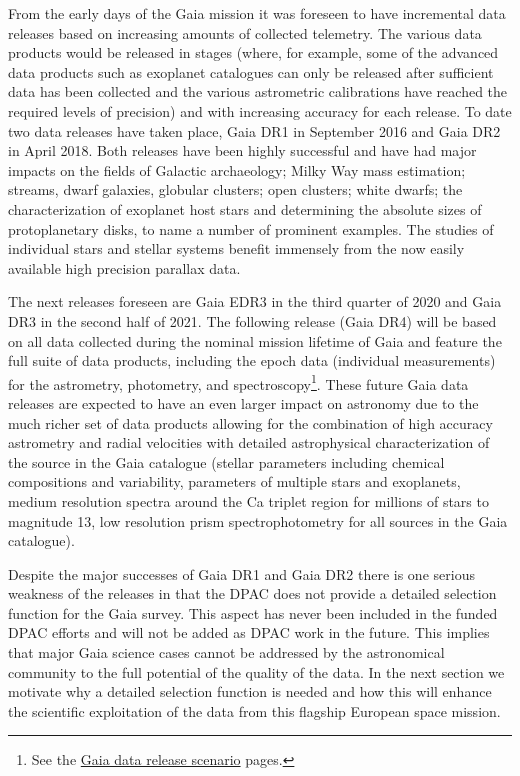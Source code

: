From the early days of the Gaia mission it was foreseen to have incremental data releases based on increasing amounts of collected telemetry. The various data products would be released in stages (where, for example, some of the advanced data products such as exoplanet catalogues can only be released after sufficient data has been collected and the various astrometric calibrations have reached the required levels of precision) and with increasing accuracy for each release. To date two data releases have taken place, Gaia DR1 in September 2016 and Gaia DR2 in April 2018. Both releases have been highly successful and have had major impacts on the fields of Galactic archaeology; Milky Way mass estimation; streams, dwarf galaxies, globular clusters; open clusters; white dwarfs; the characterization of exoplanet host stars and determining the absolute sizes of protoplanetary disks, to name a number of prominent examples. The studies of individual stars and stellar systems benefit immensely from the now easily available high precision parallax data.

The next releases foreseen are Gaia EDR3 in the third quarter of 2020 and Gaia DR3 in the second half of 2021. The following release (Gaia DR4) will be based on all data collected during the nominal mission lifetime of Gaia and feature the full suite of data products, including the epoch data (individual measurements) for the astrometry, photometry, and spectroscopy\footnote{See the \href{https://www.cosmos.esa.int/web/gaia/release}{Gaia data release scenario} pages.}. These future Gaia data releases are expected to have an even larger impact on astronomy due to the much richer set of data products allowing for the combination of high accuracy astrometry and radial velocities with detailed astrophysical characterization of the source in the Gaia catalogue (stellar parameters including chemical compositions and variability, parameters of multiple stars and exoplanets, medium resolution spectra around the Ca triplet region for millions of stars to magnitude 13, low resolution prism spectrophotometry for all sources in the Gaia catalogue). 

Despite the major successes of Gaia DR1 and Gaia DR2 there is one serious weakness of the releases in that the DPAC does not provide a detailed selection function for the Gaia survey. This aspect has never been included in the funded DPAC efforts and will not be added as DPAC work in the future. This implies that major Gaia science cases cannot be addressed by the astronomical community to the full potential of the quality of the data. In the next section we motivate why a detailed selection function is needed and how this will enhance the scientific exploitation of the data from this flagship European space mission.


